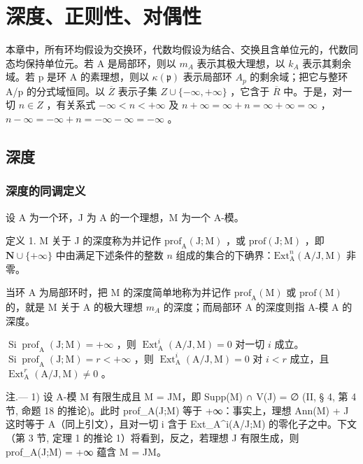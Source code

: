 \chapter{深度、正则性、对偶性}

本章中，所有环均假设为交换环，代数均假设为结合、交换且含单位元的，代数同态均保持单位元。若 A 是局部环，则以 \(m_{A}\) 表示其极大理想，以 \(k_{A}\) 表示其剩余域。若 p 是环 A 的素理想，则以 \(\kappa(\mathfrak{p})\) 表示局部环 \(A_{p}\) 的剩余域；把它与整环 A/p 的分式域恒同。以 \(\overline{Z}\) 表示子集 \(Z \cup \{-\infty, +\infty\}\) ，它含于 \(\overline{R}\) 中。于是，对一切 \(n \in Z\) ，有关系式 \(-\infty < n < +\infty\) 及 \(n + \infty = \infty + n = \infty + \infty = \infty\) ，\(n - \infty = -\infty + n = -\infty - \infty = -\infty\) 。

\section{深度}

\subsection{深度的同调定义}

设 A 为一个环，J 为 A 的一个理想，M 为一个 A-模。

定义 1. M 关于 J 的深度称为并记作 \(\mathrm{prof}_{\mathrm{A}}(\mathrm{J};\mathrm{M})\) ，或 \(\mathrm{prof}(\mathrm{J};\mathrm{M})\) ，即 \(\mathbf{N}\cup\{+\infty\}\) 中由满足下述条件的整数 \(n\) 组成的集合的下确界：\(\mathrm{Ext}_{\mathrm{A}}^{n}(\mathrm{A}/\mathrm{J},\mathrm{M})\) 非零。

当环 A 为局部环时，把 M 的深度简单地称为并记作 \(\text{prof}_{\mathrm{A}}(\mathrm{M})\) 或 \(\text{prof}(\mathrm{M})\) 的，就是 M 关于 A 的极大理想 \(m_{A}\) 的深度；而局部环 A 的深度则指 A-模 A 的深度。

\(\operatorname{Si} \operatorname{prof}_{\mathrm{A}}(\mathrm{J}; \mathrm{M}) = +\infty\) ，则 \(\operatorname{Ext}_{\mathrm{A}}^{i}(\mathrm{A}/\mathrm{J}, \mathrm{M}) = 0\) 对一切 \(i\) 成立。\(\operatorname{Si} \operatorname{prof}_{\mathrm{A}}(\mathrm{J}; \mathrm{M}) = r < +\infty\) ，则 \(\operatorname{Ext}_{\mathrm{A}}^{i}(\mathrm{A}/\mathrm{J}, \mathrm{M}) = 0\) 对 \(i < r\) 成立，且 \(\operatorname{Ext}_{\mathrm{A}}^{r}(\mathrm{A}/\mathrm{J}, \mathrm{M}) \neq 0\) 。

注.--- 1) 设 A-模 M 有限生成且 M = JM，即 Supp(M) ∩ V(J) = ∅ (II, § 4, 第 4 节, 命题 18 的推论)。此时 prof\_A(J;M) 等于 +∞：事实上，理想 Ann(M) + J 这时等于 A（同上引文），且对一切 i 含于 Ext\_A\^{}i(A/J;M) 的零化子之中。下文（第 3 节, 定理 1 的推论 1）将看到，反之，若理想 J 有限生成，则 prof\_A(J;M) = +∞ 蕴含 M = JM。

